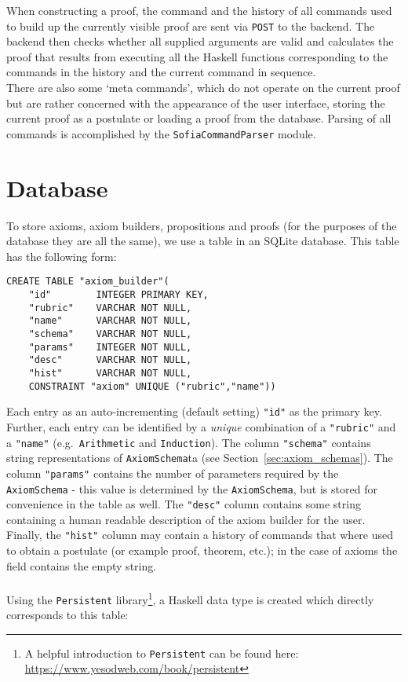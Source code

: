 \documentclass[notitlepage]{report}
\newcommand\m[1]{\texttt{#1}}
\newcommand\ms[1]{\texttt{#1}}
\begin{document}
When constructing a proof, the command and the history of all commands used to
build up the currently visible proof are sent via \texttt{POST} to the backend.
The backend then checks whether all supplied arguments are valid and calculates
the proof that results from executing all the Haskell functions corresponding to
the commands in the history and the current command in sequence.
\\
There are also some `meta commands', which do not operate on the current proof
but are rather concerned with the appearance of the user interface, storing the
current proof as a postulate or loading a proof from the database. Parsing of
all commands is accomplished by the \m{SofiaCommandParser} module.

\section{Database}
To store axioms, axiom builders, propositions and proofs (for the purposes of
the database they are all the same), we use a table in an SQLite database. This
table has the following form:

\begin{verbatim}
CREATE TABLE "axiom_builder"(
    "id"        INTEGER PRIMARY KEY,
    "rubric"    VARCHAR NOT NULL,
    "name"      VARCHAR NOT NULL,
    "schema"    VARCHAR NOT NULL,
    "params"    INTEGER NOT NULL,
    "desc"      VARCHAR NOT NULL,
    "hist"      VARCHAR NOT NULL,
    CONSTRAINT "axiom" UNIQUE ("rubric","name"))
\end{verbatim}

Each entry as an auto-incrementing (default setting) \ms{"id"} as the primary
key. Further, each entry can be identified by a \emph{unique} combination of a
\ms{"rubric"} and a \ms{"name"} (e.g.\ \texttt{Arithmetic} and
\texttt{Induction}). The column \ms{"schema"} contains string representations of
\m{AxiomSchema}ta (see Section~\ref{sec:axiom_schemas}). The column
\ms{"params"} contains the number of parameters required by the \m{AxiomSchema}
- this value is determined by the \m{AxiomSchema}, but is stored for convenience
in the table as well. The \ms{"desc"} column contains some string containing a
human readable description of the axiom builder for the user. Finally, the
\ms{"hist"} column may contain a history of commands that where used to obtain a
postulate (or example proof, theorem, etc.); in the case of axioms the field
contains the empty string.\\\\
Using the \texttt{Persistent} library\footnote{A helpful introduction to
\texttt{Persistent} can be found here:
\url{https://www.yesodweb.com/book/persistent}}, a Haskell data type is created
which directly corresponds to this table:
\end{document}
